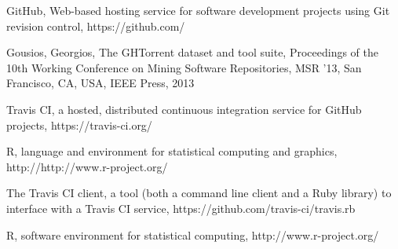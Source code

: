 \documentclass[a4paper,11pt]{article}
\begin{document}
	

	\begin{thebibliography}{9}
			GitHub, Web-based hosting service for software development projects using Git revision control, https://github.com/

			Gousios, Georgios, The GHTorrent dataset and tool suite, 
			Proceedings of the 10th Working Conference on Mining Software Repositories, MSR '13,
			San Francisco, CA, USA, IEEE Press, 2013

			Travis CI, a hosted, distributed continuous integration service for GitHub projects, https://travis-ci.org/

			R, language and environment for statistical computing and graphics, http://http://www.r-project.org/
			
		  The Travis CI client, a tool (both a command line client and a Ruby library) to interface with a Travis CI service,
		  https://github.com/travis-ci/travis.rb
		  
		  R, software environment for statistical computing, http://www.r-project.org/
		
	\end{thebibliography}
\end{document}
